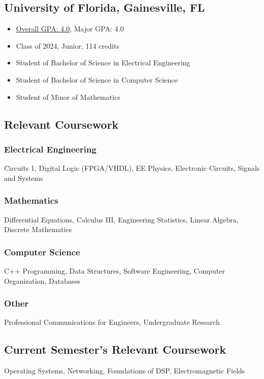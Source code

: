 \documentclass{article}
\newcommand\halftextbox[1]{%
  \parbox[t]{.475\textwidth}{#1}%
}
\newcommand\spacetextbox[1]{%
  \parbox{.05\textwidth}{#1}%
}
\newenvironment{CustomItemize}
{ \begin{itemize}[leftmargin=1em]
    \setlength{\itemsep}{0pt}
    \setlength{\parskip}{0pt}
    \setlength{\parindent}{0pt}
    \setlength{\parsep}{0pt}     }
{ \end{itemize}                  }
\begin{document}
\noindent
\halftextbox{
\begin{raggedright}
\subsection{University of Florida,  Gainesville, FL}
\begin{CustomItemize}
\item \underline{Overall GPA: 4.0}, Major GPA: 4.0
\item Class of 2024, Junior, 114 credits
\item Student of Bachelor of Science in Electrical Engineering
\item Student of Bachelor of Science in Computer Science
\item Student of Minor of Mathematics
\end{CustomItemize}

\subsection{Relevant Coursework}
\subsubsection{Electrical Engineering}
Circuits 1,
Digital Logic (FPGA/VHDL),
EE Physics,
Electronic Circuits,
Signals and Systems
\end{raggedright}
}
\spacetextbox{\hfil\hfil}
\halftextbox{
\begin{raggedright}
\subsubsection{Mathematics}
Differential Equations, 
Calculus III,
Engineering Statistics, 
Linear Algebra,
Discrete Mathematics

\subsubsection{Computer Science}
C++ Programming,
Data Structures,
Software Engineering,
Computer Organization,
Databases

\subsubsection{Other}
Professional Communications for Engineers,
Undergraduate Research

\subsection{Current Semester's Relevant Coursework}
\end{raggedright}
Operating Systems,
Networking,
Foundations of DSP,
Electromagnetic Fields
}
\end{document}
